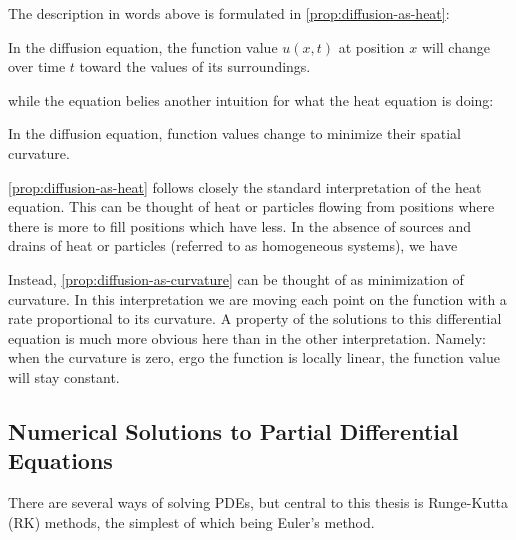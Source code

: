 \documentclass[../main.tex]{subfiles}
\begin{document}
    The description in words above is formulated in \autoref{prop:diffusion-as-heat}:

    \begin{proposition}\label{prop:diffusion-as-heat}
        In the diffusion equation, the function value $u(x, t)$ at position $x$ will change over time $t$ toward the values of its surroundings.
    \end{proposition}

    while the equation belies another intuition for what the heat equation is doing:

    \begin{proposition}\label{prop:diffusion-as-curvature}
        In the diffusion equation, function values change to minimize their spatial curvature.
    \end{proposition}

    \autoref{prop:diffusion-as-heat} follows closely the standard interpretation of the heat equation.
    This can be thought of heat or particles flowing from positions where there is more to fill positions which have less.
    In the absence of sources and drains of heat or particles (referred to as homogeneous systems), we have

    Instead, \autoref{prop:diffusion-as-curvature} can be thought of as minimization of curvature.
    In this interpretation we are moving each point on the function with a rate proportional to its curvature.
    A property of the solutions to this differential equation is much more obvious here than in the other interpretation.
    Namely: when the curvature is zero, ergo the function is locally linear, the function value will stay constant.

%
%
%

    \subsection{Numerical Solutions to Partial Differential Equations}\label{subsec:solving-partial-differential-equations}

    There are several ways of solving PDEs, but central to this thesis is Runge-Kutta (RK) methods, the simplest of which being Euler's method.
\end{document}
